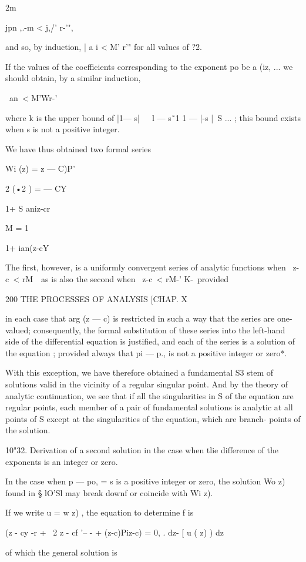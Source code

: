 2m

jpn ,.-m < j,/' r-'",

and so, by induction, | a i < M' r'" for all values of ?2.

If the values of the coefficients corresponding to the exponent po be
a (iz, ... we should obtain, by a similar induction,

\ an\ < M'Wr-'\

where k is the upper bound of |1— s|~\ \ l — s\~\ 1 1 — |-s |~S ... ;
this bound exists when s is not a positive integer.

We have thus obtained two formal series

Wi (z) = z — C)P'

 2 (•2 ) = — CY

1+ S aniz-cr

M = 1

1+ ian(z-cY

The first, however, is a uniformly convergent series of analytic
functions when \ z-c\ < rM~\ as is also the second when \ z-c\ < rM-'
K-\ provided

200 THE PROCESSES OF ANALYSIS [CHAP. X

in each case that arg (z — c) is restricted in such a way that the
series are one-valued; consequently, the formal substitution of these
series into the left-hand side of the differential equation is
justified, and each of the series is a solution of the equation ;
provided always that pi — p., is not a positive integer or zero*.

With this exception, we have therefore obtained a fundamental S3 stem
of solutions valid in the vicinity of a regular singular point. And by
the theory of analytic continuation, we see that if all the
singularities in S of the equation are regular points, each member of
a pair of fundamental solutions is analytic at all points of S except
at the singularities of the equation, which are branch- points of the
solution.

10"32. Derivation of a second solution in the case when tlie
difference of the exponents is an integer or zero.

In the case when p — po, = s is a positive integer or zero, the
solution Wo z) found in § lO'Sl may break downf or coincide with Wi
z).

If we write u = w z) , the equation to determine f is

(z - cy -r + \ 2 z - cf '-- - + (z-c)Piz-c) = 0, . dz- [ u ( z) ) dz

of which the general solution is


